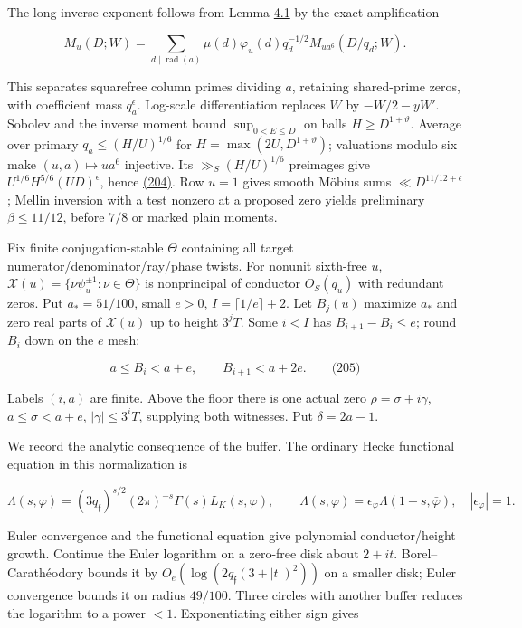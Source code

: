 The long inverse exponent follows from Lemma \protect\hyperlink{cf:inverse-moment}{4.1} by the exact amplification

\[
M_u(D;W)=\sum_{d\mid\operatorname{rad}(a)}
 \mu(d)\varphi_u(d)q_d^{-1/2}M_{ua^6}(D/q_d;W).
\]

This separates squarefree column primes dividing \(a\), retaining shared-prime zeros, with coefficient mass \(q_a^\epsilon\). Log-scale differentiation replaces \(W\) by \(-W/2-yW'\). Sobolev and the inverse moment bound \(\sup_{0<E\le D}\) on balls \(H\ge D^{1+\vartheta}\). Average over primary \(q_a\le(H/U)^{1/6}\) for \(H=\max(2U,D^{1+\vartheta})\); valuations modulo six make \((u,a)\mapsto ua^6\) injective. Its \(\gg_S(H/U)^{1/6}\) preimages give \(U^{1/6}H^{5/6}(UD)^\epsilon\), hence \protect\hyperlink{dr:unmarked}{(204)}. Row \(u=1\) gives smooth Möbius sums \(\ll D^{11/12+\epsilon}\); Mellin inversion with a test nonzero at a proposed zero yields preliminary \(\beta\le11/12\), before \(7/8\) or marked plain moments.

Fix finite conjugation-stable \(\Theta\) containing all target numerator/denominator/ray/phase twists. For nonunit sixth-free \(u\), \(\mathcal X(u)=\{\nu\psi_u^{\pm1}:\nu\in\Theta\}\) is nonprincipal of conductor \(O_S(q_u)\) with redundant zeros. Put \(a_*=51/100\), small \(e>0\), \(I=\lceil1/e\rceil+2\). Let \(B_j(u)\) maximize \(a_*\) and zero real parts of \(\mathcal X(u)\) up to height \(3^jT\). Some \(i<I\) has \(B_{i+1}-B_i\le e\); round \(B_i\) down on the \(e\) mesh:

\hypertarget{dr:bins}{}

\label{dr:bins}

\[
a\le B_i<a+e,\qquad B_{i+1}<a+2e.\qquad\text{(205)}
\]

Labels \((i,a)\) are finite. Above the floor there is one actual zero \(\rho=\sigma+i\gamma\), \(a\le\sigma<a+e\), \(|\gamma|\le3^iT\), supplying both witnesses. Put \(\delta=2a-1\).

We record the analytic consequence of the buffer. The ordinary Hecke functional equation in this normalization is

\[
\Lambda(s,\varphi)=(3q_{\mathfrak f})^{s/2}(2\pi)^{-s}
 \Gamma(s)L_K(s,\varphi),\qquad
 \Lambda(s,\varphi)=\epsilon_\varphi\Lambda(1-s,\bar\varphi),
 \quad |\epsilon_\varphi|=1.
\]

Euler convergence and the functional equation give polynomial conductor/height growth. Continue the Euler logarithm on a zero-free disk about \(2+it\). Borel--Carathéodory bounds it by \(O_e(\log(2q_{\mathfrak f}(3+|t|)^2))\) on a smaller disk; Euler convergence bounds it on radius \(49/100\). Three circles with another buffer reduces the logarithm to a power \(<1\). Exponentiating either sign gives


